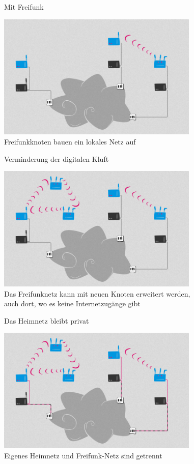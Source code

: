 \documentclass[10pt]{beamer}
\begin{document}
\begin{frame}{Mit Freifunk}
	\begin{center}
		\includegraphics[height=6cm]{images/network_2} \\
		\vfill
		Freifunkknoten bauen ein lokales Netz auf
	\end{center}
\end{frame}

\begin{frame}{Verminderung der digitalen Kluft}
	\begin{center}
		\includegraphics[height=6cm]{images/network_3} \\
		\vfill
		Das Freifunknetz kann mit neuen Knoten erweitert werden,\\ auch dort, wo es keine Internetzugänge gibt
	\end{center}
\end{frame}

\begin{frame}{Das Heimnetz bleibt privat}
	\begin{center}
		\includegraphics[height=6cm]{images/network_4} \\
		\vfill
		Eigenes Heimnetz und Freifunk-Netz sind getrennt
	\end{center}
	
\end{frame}
\end{document}
